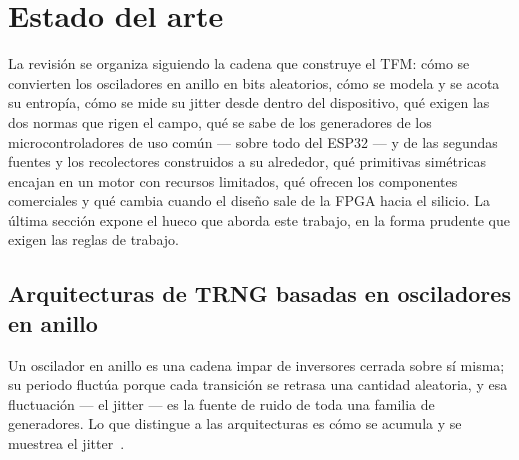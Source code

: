 \chapter{Estado del arte}
\label{ch:ch2_soa}


La revisión se organiza siguiendo la cadena que construye el TFM: cómo
se convierten los osciladores en anillo en bits aleatorios, cómo se
modela y se acota su entropía, cómo se mide su jitter desde dentro del
dispositivo, qué exigen las dos normas que rigen el campo, qué se sabe de
los generadores de los microcontroladores de uso común --- sobre todo del
ESP32 --- y de las segundas fuentes y los recolectores construidos a su
alrededor, qué primitivas
simétricas encajan en un motor con recursos limitados, qué ofrecen los
componentes comerciales y qué cambia cuando el diseño sale de la FPGA
hacia el silicio. La última sección expone el hueco que aborda este
trabajo, en la forma prudente que exigen las reglas de trabajo.

\section{Arquitecturas de TRNG basadas en osciladores en anillo}
\label{sec:soa_archs}

Un oscilador en anillo es una cadena impar de inversores cerrada sobre sí
misma; su periodo fluctúa porque cada transición se retrasa una cantidad
aleatoria, y esa fluctuación --- el jitter --- es la fuente de ruido de
toda una familia de generadores. Lo que distingue a las arquitecturas es
cómo se acumula y se muestrea el jitter~\cite{petura_2016_survey, lubicz_2024_recommendations}.


